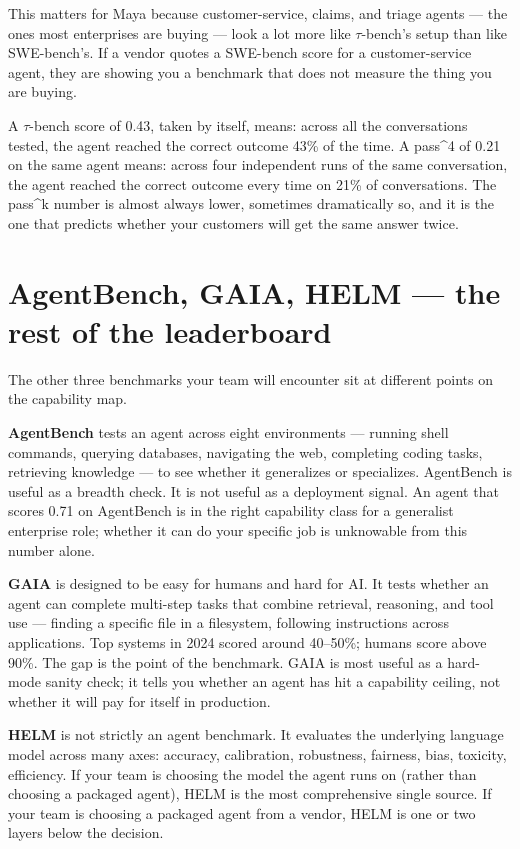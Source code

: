 This matters for Maya because customer-service, claims, and triage agents --- the ones most enterprises are buying --- look a lot more like $\tau$-bench's setup than like SWE-bench's. If a vendor quotes a SWE-bench score for a customer-service agent, they are showing you a benchmark that does not measure the thing you are buying.

A $\tau$-bench score of 0.43, taken by itself, means: across all the conversations tested, the agent reached the correct outcome 43\% of the time. A pass\textasciicircum 4 of 0.21 on the same agent means: across four independent runs of the same conversation, the agent reached the correct outcome every time on 21\% of conversations. The pass\textasciicircum k number is almost always lower, sometimes dramatically so, and it is the one that predicts whether your customers will get the same answer twice.

\section{AgentBench, GAIA, HELM --- the rest of the leaderboard}

The other three benchmarks your team will encounter sit at different points on the capability map.

\textbf{AgentBench} \citep{liu2023agentbench} tests an agent across eight environments --- running shell commands, querying databases, navigating the web, completing coding tasks, retrieving knowledge --- to see whether it generalizes or specializes. AgentBench is useful as a breadth check. It is not useful as a deployment signal. An agent that scores 0.71 on AgentBench is in the right capability class for a generalist enterprise role; whether it can do your specific job is unknowable from this number alone.

\textbf{GAIA} \citep{mialon2023gaia} is designed to be easy for humans and hard for AI. It tests whether an agent can complete multi-step tasks that combine retrieval, reasoning, and tool use --- finding a specific file in a filesystem, following instructions across applications. Top systems in 2024 scored around 40--50\%; humans score above 90\%. The gap is the point of the benchmark. GAIA is most useful as a hard-mode sanity check; it tells you whether an agent has hit a capability ceiling, not whether it will pay for itself in production.

\textbf{HELM} \citep{liang2022helm} is not strictly an agent benchmark. It evaluates the underlying language model across many axes: accuracy, calibration, robustness, fairness, bias, toxicity, efficiency. If your team is choosing the model the agent runs on (rather than choosing a packaged agent), HELM is the most comprehensive single source. If your team is choosing a packaged agent from a vendor, HELM is one or two layers below the decision.

